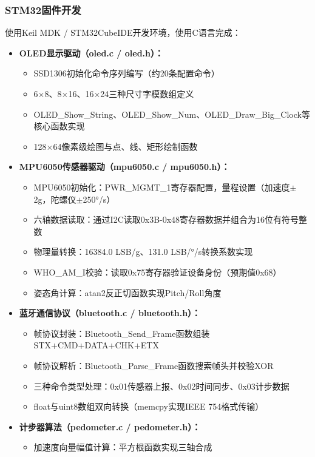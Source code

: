 \subsubsection{STM32固件开发}
使用Keil MDK / STM32CubeIDE开发环境，使用C语言完成：
\begin{itemize}
    \item \textbf{OLED显示驱动（oled.c / oled.h）：}
    \begin{itemize}
        \item SSD1306初始化命令序列编写（约20条配置命令）
        \item 6$\times$8、8$\times$16、16$\times$24三种尺寸字模数组定义
        \item OLED\_Show\_String、OLED\_Show\_Num、OLED\_Draw\_Big\_Clock等核心函数实现
        \item 128$\times$64像素级绘图与点、线、矩形绘制函数
    \end{itemize}
    \item \textbf{MPU6050传感器驱动（mpu6050.c / mpu6050.h）：}
    \begin{itemize}
        \item MPU6050初始化：PWR\_MGMT\_1寄存器配置，量程设置（加速度$\pm$2g，陀螺仪$\pm$250°/s）
        \item 六轴数据读取：通过I2C读取0x3B-0x48寄存器数据并组合为16位有符号整数
        \item 物理量转换：16384.0 LSB/g、131.0 LSB/°/s转换系数实现
        \item WHO\_AM\_I校验：读取0x75寄存器验证设备身份（预期值0x68）
        \item 姿态角计算：atan2反正切函数实现Pitch/Roll角度
    \end{itemize}
    \item \textbf{蓝牙通信协议（bluetooth.c / bluetooth.h）：}
    \begin{itemize}
        \item 帧协议封装：Bluetooth\_Send\_Frame函数组装STX+CMD+DATA+CHK+ETX
        \item 帧协议解析：Bluetooth\_Parse\_Frame函数搜索帧头并校验XOR
        \item 三种命令类型处理：0x01传感器上报、0x02时间同步、0x03计步数据
        \item float与uint8数组双向转换（memcpy实现IEEE 754格式传输）
    \end{itemize}
    \item \textbf{计步器算法（pedometer.c / pedometer.h）：}
    \begin{itemize}
        \item 加速度向量幅值计算：平方根函数实现三轴合成

\end{itemize}
\end{itemize}
